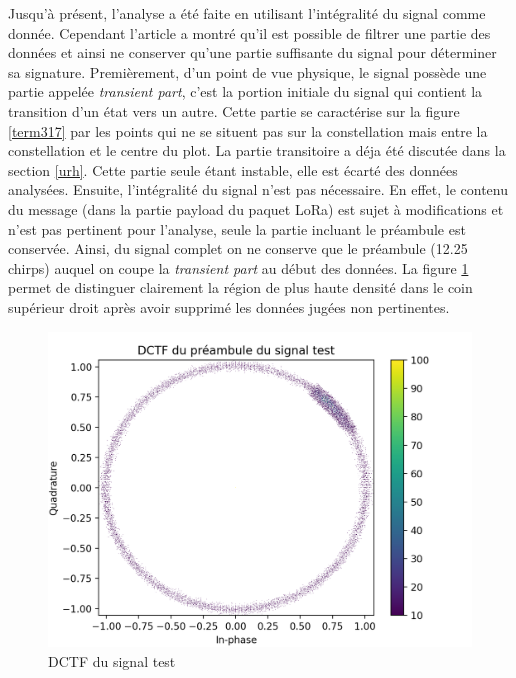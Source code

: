 Jusqu'à présent, l'analyse a été faite en utilisant l'intégralité du signal comme donnée. Cependant l'article \cite{loraDCTF} a montré qu'il est possible de filtrer une partie des données et ainsi ne conserver qu'une partie suffisante du signal pour déterminer sa signature. Premièrement, d'un point de vue physique, le signal possède une partie appelée \textit{transient part}, c'est la portion initiale du signal qui contient la transition d'un état vers un autre. Cette partie se caractérise sur la figure \ref{term317} par les points qui ne se situent pas sur la constellation mais entre la constellation et le centre du plot. La partie transitoire a déja été discutée dans la section \ref{urh}. Cette partie seule étant instable, elle est écarté des données analysées. Ensuite, l'intégralité du signal n'est pas nécessaire. En effet, le contenu du message (dans la partie payload du paquet LoRa) est sujet à modifications et n'est pas pertinent pour l'analyse, seule la partie incluant le préambule est conservée. Ainsi, du signal complet on ne conserve que le préambule (12.25 chirps) auquel on coupe la \textit{transient part} au début des données. La figure \ref{term318} permet de distinguer clairement la région de plus haute densité dans le coin supérieur droit après avoir supprimé les données jugées non pertinentes.

\begin{figure}[h]
\centering

\includegraphics[scale=0.3]{images/dctf5.png}
\caption{DCTF du signal test}\label{term318}
\end{figure}

